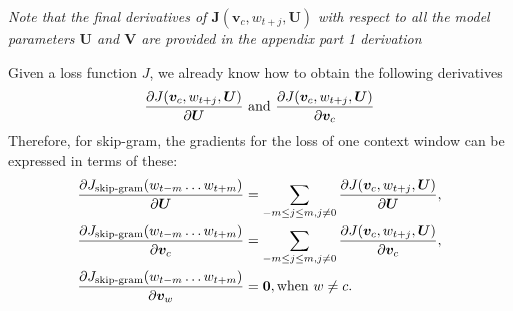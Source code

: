 \begin{enumerate}
        \textit{ Note that the final derivatives of $\bm J(\bm v_c, w_{t+j}, \bm U)$ with respect to all the model parameters $\bm U$ and $\bm V$ are provided in the appendix part 1 derivation} 
        
        \begin{answer}
            Given a loss function $J$, we already know how to obtain the following derivatives
            \begin{equation*}
                {\partial J(\bm v_c, w_{t+j}, \bm U) \over \partial \bm U} \textrm{ and } {\partial J(\bm v_c, w_{t+j}, \bm U) \over \partial \bm v_c}
            \end{equation*}
            Therefore, for skip-gram, the gradients for the loss of one context window can be expressed in terms of these:
            \begin{align*}
                {\partial J_{\textrm{skip-gram}}(w_{t-m}\ldots w_{t+m}) \over \partial \bm U} &= \sum_{-m \le j \le m, j\ne 0} {\partial J(\bm v_c, w_{t+j}, \bm U) \over \partial \bm U},\\
                {\partial J_{\textrm{skip-gram}}(w_{t-m}\ldots w_{t+m}) \over \partial \bm v_c} &= \sum_{-m \le j \le m, j\ne 0} {\partial J(\bm v_c, w_{t+j}, \bm U) \over \partial \bm v_c},\\
                {\partial J_{\textrm{skip-gram}}(w_{t-m}\ldots w_{t+m}) \over \partial \bm v_{w}} &= \bm 0, \textrm{when } w \ne c.
            \end{align*}
        \end{answer}
\end{enumerate}

